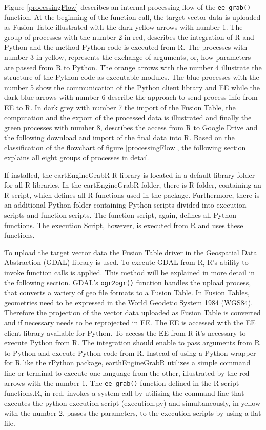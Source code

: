 Figure \ref{processingFlow} describes an internal processing flow of the \texttt{ee\_grab()} function.
At the beginning of the function call, the target vector data is uploaded as Fusion Table illustrated with the dark yellow arrows with number 1. 
The group of processes with the number 2 in red, describes the integration of R and Python and the method Python code is executed from R. The processes with number 3 in yellow, represents the exchange of arguments, or,  how parameters are passed from R to Python. The orange arrows with the number 4 illustrate the structure of the Python code as executable modules. The blue processes with the number 5 show the communication of the Python client library and EE while the dark blue arrows with number 6 describe the approach to send process info from EE to R. In dark grey with number 7 the import of the Fusion Table, the computation and the export of the processed data is illustrated and finally the green processes with number 8, describes the access from R to Google Drive and the following download and import of the final data into R.
Based on the classification of the flowchart of figure \ref{processingFlow}, the following section explains all eight groups of processes in detail.

If installed, the eartEngineGrabR R library is located in a default library folder for all R libraries. In the eartEngineGrabR folder, there is R folder, containing an R script, which defines all R functions used in the package. Furthermore, there is an additional Python folder containing Python scripts divided into execution scripts and function scripts. The function script, again, defines all Python functions. The execution Script, however, is executed from R and uses these functions.

To upload the target vector data the Fusion Table driver in the Geospatial Data Abstraction (GDAL) library is used. To execute GDAL from R, R's ability to invoke function calls is applied. This method will be explained in more detail in the following section. GDAL's \texttt{ogr2ogr()}  function handles the upload process, that converts a variety of geo file formats to a Fusion Table. In Fusion Tables, geometries need to be expressed in the World Geodetic System 1984 (WGS84). Therefore the projection of the vector data uploaded as Fusion Table is converted and if necessary needs to be reprojected in EE.
The EE is accessed with the EE client library available for Python. To access the EE from R it's necessary to execute Python from R. The integration should enable to pass arguments from R to Python and execute Python code from R. Instead of using a Python wrapper for R like the rPython package, earthEngineGrabR utilizes a simple command line or terminal to execute one language from the other, illustrated by the red arrows with the number 1. The \texttt{ee\_grab()} function defined in the R script functions.R, in red, invokes a system call by utilising the command line that executes the python execution script (execution.py) and simultaneously, in yellow with the number 2, passes the parameters, to the execution scripts by using a flat file. 

